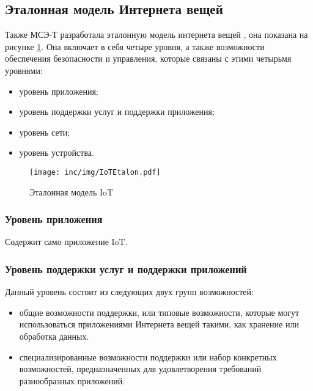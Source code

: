 \subsection{Эталонная модель Интернета вещей}

Также МСЭ-Т разработала эталонную модель интернета вещей \cite{itutiot2012}, она 
показана на рисунке \ref{fig:iotetalon}.
Она включает в себя четыре уровня, а также возможности обеспечения безопасности 
и управления, которые связаны с этими четырьмя уровнями:

\begin{itemize}
	\item уровень приложения;
	\item уровень поддержки услуг и поддержки приложения;
	\item уровень сети;
	\item уровень устройства.
\end{itemize}

\begin{figure}
  \centering
  \texttt{[image: inc/img/IoTEtalon.pdf]}
	\caption{Эталонная модель IoT}
  \label{fig:iotetalon}
\end{figure}


\subsubsection{Уровень приложения}

Содержит само приложение IoT.


\subsubsection{Уровень поддержки услуг и поддержки приложений}

Данный уровень состоит из следующих двух групп возможностей:

\begin{itemize}
	\item общие возможности поддержки, или типовые возможности, которые 
могут использоваться приложениями Интернета вещей такими, как хранение или 
обработка данных.
	\item специализированные возможности поддержки или набор конкретных 
возможностей, предназначенных для удовлетворения требований разнообразных 
приложений.
\end{itemize}


